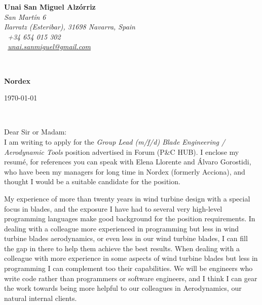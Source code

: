 \documentclass[11pt]{article}
\begin{document}
\sffamily   %
\hfill%
\begin{minipage}[t]{.6\textwidth}
\raggedleft%
{\bfseries Unai San Miguel Alzórriz}\\[.35ex]
\small\itshape%
San Martín 6\\
Ilarratz (Esteribar), 31698 Navarra, Spain\\[.35ex]
\Telefon~+34 654 015 302\\
\Letter~\href{mailto:unai.sanmiguel@gmail.com}{unai.sanmiguel@gmail.com}
\end{minipage}\\[1em]
%
\begin{minipage}[t]{.4\textwidth}
\raggedright%
{\bfseries Nordex}\\[.35ex]
\small\itshape%
\end{minipage}
\hfill %
\begin{minipage}[t]{.4\textwidth}
\raggedleft %
\today
\end{minipage}\\[2em]
\raggedright
Dear Sir or Madam:\\[1.5em]
%

I am writing to apply for the \emph{Group Lead (m/f/d) Blade Engineering / Aerodynamic Tools} position advertised in Forum (P\&C HUB). I enclose my resumé, for references you can speak with Elena Llorente and Álvaro Gorostidi, who have been my managers for long time in Nordex (formerly Acciona), and thought I would be a suitable candidate for the position.

My experience of more than twenty years in wind turbine design with a special focus in blades, and the exposure I have had to several very high-level programming languages make good background for the position requirements. In dealing with a colleague more experienced in programming but less in wind turbine blades aerodynamics, or even less in our wind turbine blades, I can fill the gap in there to help them achieve the best results. When dealing with a colleague with more experience in some aspects of wind turbine blades but less in programming I can complement too their capabilities. We will be engineers who write code rather than programmers or software engineers, and I think I can gear the work towards being more helpful to our colleagues in Aerodynamics, our natural internal clients.
\end{document}
